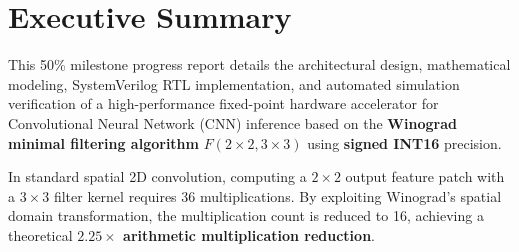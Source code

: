 \documentclass[12pt,a4paper]{article}
\begin{document}
\newpage
\setcounter{page}{1}

\section*{Executive Summary}

This 50\% milestone progress report details the architectural design, mathematical modeling, SystemVerilog RTL implementation, and automated simulation verification of a high-performance fixed-point hardware accelerator for Convolutional Neural Network (CNN) inference based on the \textbf{Winograd minimal filtering algorithm} $F(2 \times 2, 3 \times 3)$ using \textbf{signed INT16} precision.

In standard spatial 2D convolution, computing a $2 \times 2$ output feature patch with a $3 \times 3$ filter kernel requires 36 multiplications. By exploiting Winograd's spatial domain transformation, the multiplication count is reduced to 16, achieving a theoretical \textbf{$2.25\times$ arithmetic multiplication reduction}.
\end{document}
